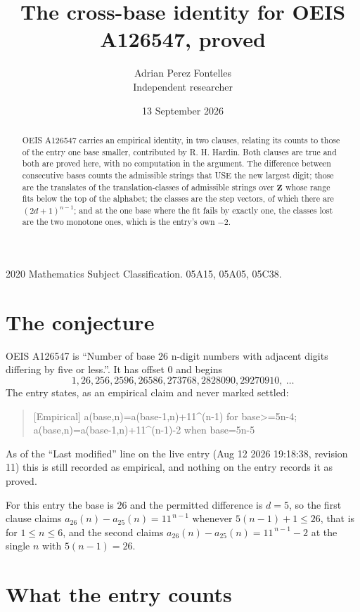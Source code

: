 \documentclass[11pt,a4paper]{article}
\title{The cross-base identity for OEIS A126547, proved}
\author{Adrian Perez Fontelles\\ \small Independent researcher}
\date{13 September 2026}
\theoremstyle{plain}
\theoremstyle{definition}
\begin{document}
\maketitle

\begin{abstract}
OEIS A126547 carries an empirical identity, in two clauses, relating its counts to those of the
entry one base smaller, contributed by R. H. Hardin. Both clauses are true and both are proved
here, with no computation in the argument. The difference between consecutive bases counts the
admissible strings that USE the new largest digit; those are the translates of the
translation-classes of admissible strings over $\mathbf{Z}$ whose range fits below the top of
the alphabet; the classes are the step vectors, of which there are $(2d+1)^{n-1}$; and at the
one base where the fit fails by exactly one, the classes lost are the two monotone ones, which
is the entry's own $-2$.
\end{abstract}

\noindent\small 2020 Mathematics Subject Classification. 05A15, 05A05, 05C38.\normalsize

\section{The conjecture}

OEIS A126547 is ``Number of base 26 n-digit numbers with adjacent digits differing by five or less.''. It has offset $0$ and begins
\[
1, 26, 256, 2596, 26586, 273768, 2828090, 29270910,\ \dots
\]
The entry states, as an empirical claim and never marked settled:
\begin{quote}
[Empirical] a(base,n)=a(base-1,n)+11\textasciicircum{}(n-1) for base>=5n-4; a(base,n)=a(base-1,n)+11\textasciicircum{}(n-1)-2 when base=5n-5
\end{quote}
As of the ``Last modified'' line on the live entry (Aug 12 2026 19:18:38, revision 11)
this is still recorded as empirical, and nothing on the entry records it as proved.

For this entry the base is $26$ and the permitted difference is $d=5$, so the first clause
claims $a_{26}(n)-a_{25}(n)=11^{\,n-1}$ whenever $5(n-1)+1\le26$, that is for
$1\le n\le6$, and the second claims $a_{26}(n)-a_{25}(n)=11^{\,n-1}-2$ at the single
$n$ with $5(n-1)=26$.

\section{What the entry counts}
\end{document}
